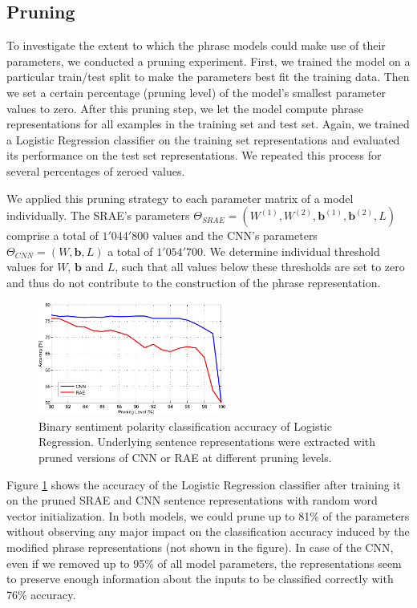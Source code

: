\documentclass{llncs}
\begin{document}
\subsection{Pruning}
\label{sec:exppru}
To investigate the extent to which the phrase models could make use of their parameters, we conducted a pruning experiment. First, we trained the model on a particular train/test split to make the parameters best fit the training data. Then we set a certain percentage (pruning level) of the model's smallest parameter values to zero. After this pruning step, we let the model compute phrase representations for all examples in the training set and test set. Again, we trained a Logistic Regression classifier on the training set representations and evaluated its performance on the test set representations. We repeated this process for several percentages of zeroed values.

We applied this pruning strategy to each parameter matrix of a model individually. The SRAE's parameters $\Theta_{SRAE} = (W^{(1)}, W^{(2)}, \mathbf{b}^{(1)}, \mathbf{b}^{(2)}, L)$ comprise a total of $1'044'800$ values and the CNN's parameters $\Theta_{CNN} = (W, \mathbf{b}, L)$ a total of $1'054'700$. We determine individual threshold values for $W$, $\mathbf{b}$ and $L$, such that all values below these thresholds are set to zero and thus do not contribute to the construction of the phrase representation.

\begin{figure}
    \includegraphics[width=0.55\textwidth]{Figures/pruning80-100-all_small.pdf}
    \caption{Binary sentiment polarity classification accuracy of Logistic Regression. Underlying sentence representations were extracted with pruned versions of CNN or RAE at different pruning levels.}
  \label{fig:pruning}
\end{figure}

Figure \ref{fig:pruning} shows the accuracy of the Logistic Regression classifier after training it on the pruned SRAE and CNN sentence representations with random word vector initialization. In both models, we could prune up to 81\% of the parameters without observing any major impact on the classification accuracy induced by the modified phrase representations (not shown in the figure). In case of the CNN, even if we removed up to 95\% of all model parameters, the representations seem to preserve enough information about the inputs to be classified correctly with 76\% accuracy.
\end{document}
